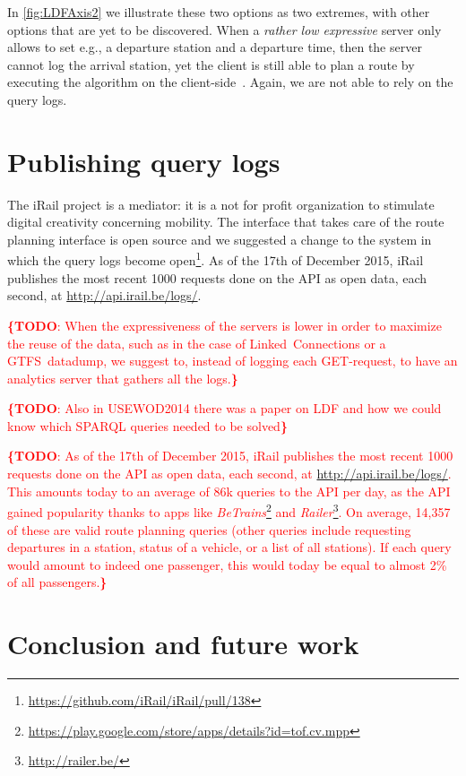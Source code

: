 \documentclass{sig-alternate}
\newcommand{\todo}[1]{\noindent\textcolor{red}{{\bf \{TODO}: #1{\bf \}}}}
\begin{document}
In \cref{fig:LDFAxis2} we illustrate these two options as two extremes, with other options that are yet to be discovered.
When a \emph{rather low expressive} server only allows to set e.g., a departure station and a departure time, then the server cannot log the arrival station, yet the client is still able to plan a route by executing the algorithm on the client-side~\cite{lc}.
Again, we are not able to rely on the query logs.

\section{Publishing query logs}
\label{sec:publishingquerylogs}

The iRail project is a mediator: it is a not for profit organization to stimulate digital creativity concerning mobility.
The interface that takes care of the route planning interface is open source and we suggested a change to the system in which the query logs become open\footnote{\url{https://github.com/iRail/iRail/pull/138}}.
As of the 17th of December 2015, iRail publishes the most recent 1000 requests done on the API as open data, each second, at \url{http://api.irail.be/logs/}.

\todo{When the expressiveness of the servers is lower in order to maximize the reuse of the data, such as in the case of Linked~Connections or a GTFS~datadump, we suggest to, instead of logging each GET-request, to have an analytics server that gathers all the logs.}

\todo{Also in USEWOD2014 there was a paper on LDF and how we could know which SPARQL queries needed to be solved}

\todo{As of the 17th of December 2015, iRail publishes the most recent 1000 requests done on the API as open data, each second, at \url{http://api.irail.be/logs/}.
This amounts today to an average of 86k queries to the API per day, as the API gained popularity thanks to apps like \emph{BeTrains}\footnote{\url{https://play.google.com/store/apps/details?id=tof.cv.mpp}} and \emph{Railer}\footnote{\url{http://railer.be/}}.
On average, 14,357 of these are valid route planning queries (other queries include requesting departures in a station, status of a vehicle, or a list of all stations).
If each query would amount to indeed one passenger, this would today be equal to almost 2\% of all passengers.}

\section{Conclusion and future work}
\label{sec:conclusion}
\end{document}
